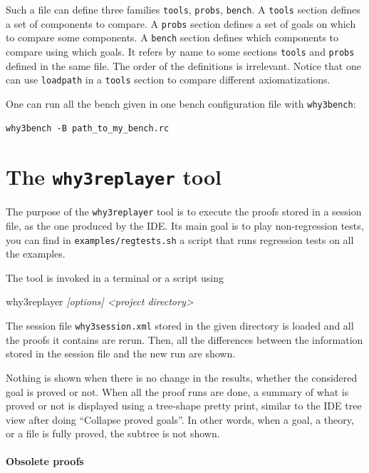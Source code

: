 Such a file can define three families \texttt{tools}, \texttt{probs},
\texttt{bench}. A \texttt{tools} section defines a set of components to
compare. A \texttt{probs} section defines a set of goals on which to compare some
components. A \texttt{bench} section defines which components to
compare using which goals. It refers by name to some sections
\texttt{tools} and \texttt{probs} defined in the same file. The order
of the definitions is irrelevant. Notice that one can use
\texttt{loadpath} in a \texttt{tools} section to compare different
axiomatizations.

One can run all the bench given in one bench configuration file with
\texttt{why3bench}:
\begin{verbatim}
why3bench -B path_to_my_bench.rc
\end{verbatim}

\section{The \texttt{why3replayer} tool}
\label{sec:why3replayer}

The purpose of the \texttt{why3replayer} tool is to execute the proofs
stored in a \why session file, as the one produced by the IDE. Its
main goal is to play non-regression tests, \eg you can find in
\texttt{examples/regtests.sh} a script that runs regression tests on
all the examples.

The tool is invoked in a terminal or a script using
\begin{flushleft}\ttfamily
  why3replayer \textsl{[options] <project directory>}
\end{flushleft}
The session file \texttt{why3session.xml} stored in the given
directory is loaded and all the proofs it contains are rerun. Then,
all the differences between the information stored in the session file and
the new run are shown.

Nothing is shown when there is no change in the results, whether the
considered goal is proved or not. When all the proof
runs are done, a summary of what is proved or not is displayed using a
tree-shape pretty print, similar to the IDE tree view after doing
``Collapse proved goals''. In other words, when a goal, a theory, or a
file is fully proved, the subtree is not shown.

\paragraph{Obsolete proofs}

